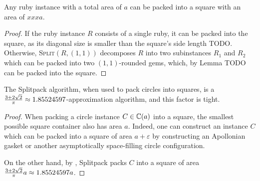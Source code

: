 \documentclass[a4paper,style=print,bibliography=totoc,nexus,lnum,extramargin]{tubsbook}
\begin{document}
%
%

\begin{theorem}\label{th:square}
    Any ruby instance with a total area of $a$ can be packed into a square with an area of $xxx a$.
\end{theorem}

\begin{proof}
    If the ruby instance $R$ consists of a single ruby, it can be packed into the square, as its diagonal size is smaller than the square's side length TODO.
    Otherwise, \textsc{Split}$(R, (1,1))$ decomposes $R$ into two subinstances $R_1$ and $R_2$ which can be packed into two $(1,1)$-rounded gems, which, by Lemma TODO can be packed into the square.
\end{proof}

\begin{theorem}
    The Splitpack algorithm, when used to pack circles into squares, is a $\frac{3+2\sqrt{2}}{\pi} \approx 1.85524597$-approximation algorithm, and this factor is tight.
\end{theorem}

\begin{proof}
    When packing a circle instance $C \in \mathbb{C}(a)$ into a square, the smallest possible square container also has area $a$. Indeed, one can construct an instance $C$ which can be packed into a square of area $a+\varepsilon$ by constructing an Apollonian gasket or another asymptotically space-filling circle configuration.

    On the other hand, by , Splitpack packs $C$ into a square of area $\frac{3+2\sqrt{2}}{\pi}a \approx 1.85524597a$.
\end{proof}
\end{document}
